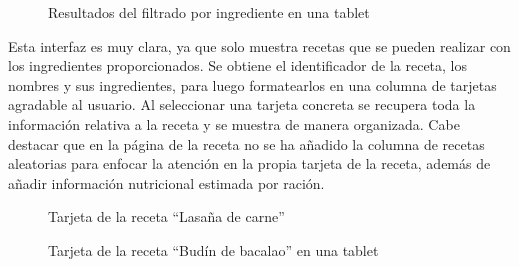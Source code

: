 \begin{figure}[h!]
\centering
{}
\caption{Resultados del filtrado por ingrediente en una tablet}
\label{fig:resultados-tablet}
\end{figure}

\newpage
Esta \gls{interfaz} es muy clara, ya que solo muestra recetas que se pueden realizar con los ingredientes proporcionados. Se obtiene el identificador de la receta, los nombres y sus ingredientes, para luego formatearlos en una columna de tarjetas agradable al usuario. Al seleccionar una tarjeta concreta se recupera toda la información relativa a la receta y se muestra de manera organizada. Cabe destacar que en la página de la receta no se ha añadido la columna de recetas aleatorias para enfocar la atención en la propia tarjeta de la receta, además de añadir información nutricional estimada por ración.

\begin{figure}[h!]
\centering
{}
\caption{Tarjeta de la receta ``Lasaña de carne''}
\label{fig:receta}
\end{figure}

\begin{figure}[h!]
\centering
{}
\caption{Tarjeta de la receta ``Budín de bacalao'' en una tablet}
\label{fig:receta-tablet}
\end{figure}

